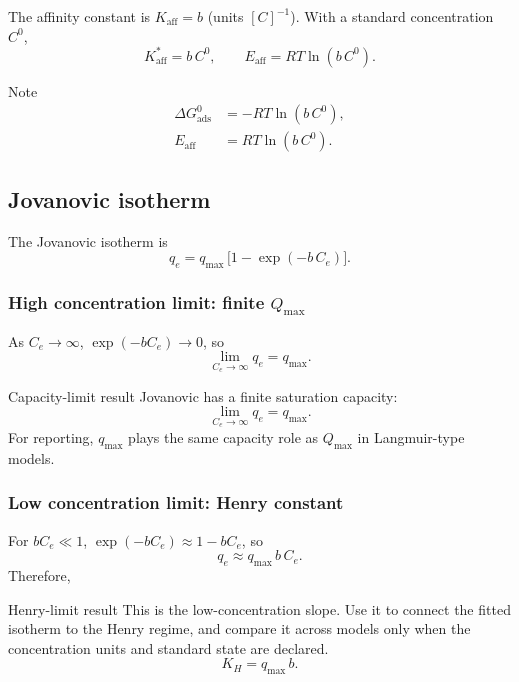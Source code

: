 \documentclass[journal=jacsat,manuscript=article]{achemso}
\begin{document}
The affinity constant is $K_{\mathrm{aff}} = b$ (units $[C]^{-1}$). With a standard concentration $C^0$,
\begin{equation}
	K_{\mathrm{aff}}^{\ast} = b\, C^0,
	\qquad
	E_{\mathrm{aff}} = RT\ln(b\, C^0).
\end{equation}
\begin{bluebox}{Note}
	\begin{equation}
		\begin{aligned}
			\Delta G_{\mathrm{ads}}^{0} &= -RT\ln\!\left(b\, C^0\right),\\
			E_{\mathrm{aff}} &= RT\ln\!\left(b\, C^0\right).
		\end{aligned}
	\end{equation}
\end{bluebox}

\subsection{Jovanovic isotherm}
\label{sec:si_jovanovic}

The Jovanovic isotherm is
\begin{equation}
	q_e = q_{\max}\,\bigl[1 - \exp(-b\, C_e)\bigr].
	\label{eq:si_jovanovic}
\end{equation}

\subsubsection{High concentration limit: finite $Q_{\max}$}

As $C_e \to \infty$, $\exp(-bC_e) \to 0$, so
\begin{equation}
	\lim_{C_e \to \infty} q_e = q_{\max}.
\end{equation}
\begin{greenbox}{Capacity-limit result}
	Jovanovic has a finite saturation capacity:
	\begin{equation}
		\lim_{C_e \to \infty} q_e = q_{\max}.
	\end{equation}
	For reporting, \(q_{\max}\) plays the same capacity role as
	\(Q_{\max}\) in Langmuir-type models.
\end{greenbox}

\subsubsection{Low concentration limit: Henry constant}

For $bC_e \ll 1$, $\exp(-bC_e) \approx 1 - bC_e$, so
\begin{equation}
	q_e \approx q_{\max}\, b\, C_e.
\end{equation}
Therefore,
\begin{greenbox}{Henry-limit result}
	This is the low-concentration slope. Use it to connect the fitted isotherm to the Henry regime, and compare it across models only when the concentration units and standard state are declared.
\begin{equation}
	K_H = q_{\max}\, b.
\end{equation}
\end{greenbox}
\end{document}
